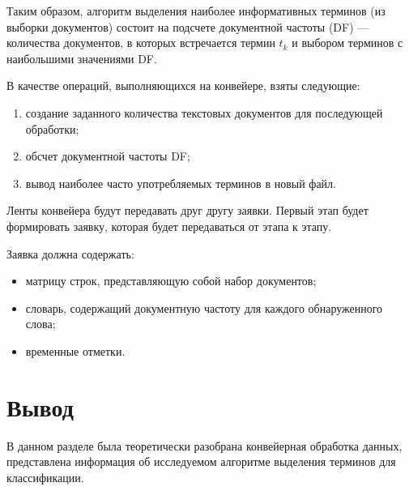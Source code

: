 Таким образом, алгоритм выделения наиболее информативных терминов (из выборки документов) состоит на подсчете документной частоты (DF) --- количества документов, в которых встречается термин $t_k$ и выбором терминов с наибольшими значениями DF.


В качестве операций, выполняющихся на конвейере, взяты следующие:

\begin{enumerate}
	\item создание заданного количества текстовых документов для последующей обработки;
	\item обсчет документной частоты DF;
	\item вывод наиболее часто употребляемых терминов в новый файл.
\end{enumerate}

Ленты конвейера будут передавать друг другу заявки. 
Первый этап будет формировать заявку, которая будет передаваться от этапа к этапу.

Заявка должна содержать:

\begin{itemize}
	\item матрицу строк, представляющую собой набор документов;
	\item словарь, содержащий документную частоту для каждого обнаруженного слова;
	\item временные отметки.
\end{itemize}


\section*{Вывод}
В данном разделе была теоретически разобрана конвейерная обработка данных, представлена информация об исследуемом алгоритме выделения терминов для классификации.